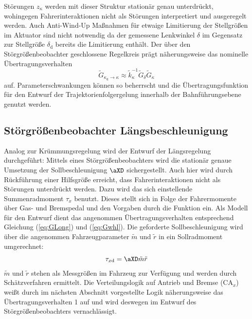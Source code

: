 %
Störungen $z_\kappa$ werden mit dieser Struktur stationär genau unterdrückt, wohingegen Fahrerinteraktionen nicht als Störungen interpretiert und ausgeregelt werden.  Auch Anti-Wind-Up Maßnahmen für etwaige Limitierung der Stellgrößen im Aktuator sind nicht notwendig da der  gemessene Lenkwinkel $\delta$ im Gegensatz zur Stellgröße $\delta_\mathrm{d}$ bereits die Limitierung enthält. Der über den Störgrößenbeobachter geschlossene Regelkreis prägt näherungsweise das nominelle Übertragungsverhalten 
\begin{equation}
\tilde G_{\kappa_\mathrm{d}\rightarrow \kappa} \approx \tilde k_\kappa^{-1} \tilde G_\delta \tilde G_\kappa
\end{equation}
auf.  Parameterschwankungen können so beherrscht und die Übertragungsfunktion für den Entwurf der Trajektorienfolgergelung innerhalb der Bahnführungsebene genutzt werden.
%
\subsection{Störgrößenbeobachter Längsbeschleunigung}
Analog zur Krümmungsregelung wird der Entwurf der Längsregelung durchgeführt: Mittels eines Störgrößenbeobachters wird die stationär genaue Umsetzung der Sollbeschleunigung $\aXD$ sichergestellt.  Auch hier wird durch Rückführung einer Hilfsgröße erreicht, dass Fahrerinteraktionen nicht als Störungen unterdrückt werden.  Dazu wird das sich einstellende Summenradmoment $\tau_{x}$ benutzt.  Dieses stellt sich in Folge der Fahrermomente über Gas- und Bremspedal und den Vorgaben durch die Funktion ein.  Als Modell für den Entwurf dient das angenommen Übertragungsverhalten entsprechend Gleichung (\ref{eq:GLong}) und (\ref{eq:Gwhl}).  Die geforderte Sollbeschleunigung wird über die angenommen Fahrzeugparameter $\tilde m$ und $\tilde r$ in ein Sollradmoment umgerechnet:
\begin{equation}
\tau_{x\mathrm{d}} = \aXD \tilde m \tilde r
\end{equation}
$\tilde m$ und $\tilde r$ stehen als Messgrößen im Fahrzeug zur Verfügung und werden durch Schätzverfahren ermittelt.  Die Verteilungslogik auf Antrieb und  Bremse ($\mathrm{CA}_x$) weißt durch im nächsten Abschnitt vorgestellte Logik näherungsweise das Übertragungsverhalten 1 auf und wird deswegen im Entwurf des Störgrößenbeobachters vernachlässigt.

